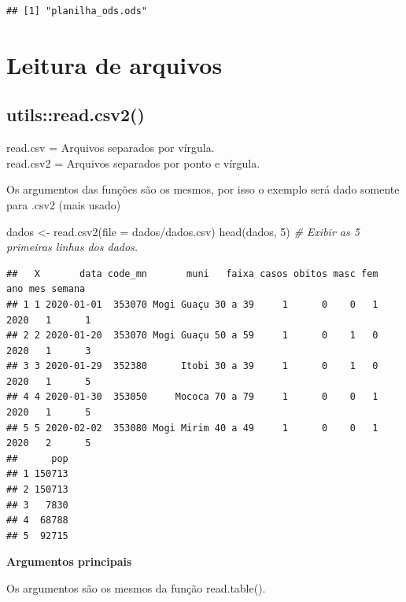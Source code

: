 \documentclass[
]{book}
\newenvironment{Shaded}{\begin{snugshade}}{\end{snugshade}}
\newcommand{\AttributeTok}[1]{\textcolor[rgb]{0.77,0.63,0.00}{#1}}
\newcommand{\CommentTok}[1]{\textcolor[rgb]{0.56,0.35,0.01}{\textit{#1}}}
\newcommand{\DecValTok}[1]{\textcolor[rgb]{0.00,0.00,0.81}{#1}}
\newcommand{\FunctionTok}[1]{\textcolor[rgb]{0.00,0.00,0.00}{#1}}
\newcommand{\NormalTok}[1]{#1}
\newcommand{\OtherTok}[1]{\textcolor[rgb]{0.56,0.35,0.01}{#1}}
\newcommand{\StringTok}[1]{\textcolor[rgb]{0.31,0.60,0.02}{#1}}
\theoremstyle{definition}
\theoremstyle{definition}
\theoremstyle{definition}
\theoremstyle{definition}
\theoremstyle{remark}
\begin{document}
\begin{verbatim}
## [1] "planilha_ods.ods"
\end{verbatim}

\hypertarget{leitura-de-arquivos}{%
\section{Leitura de arquivos}\label{leitura-de-arquivos}}

\hypertarget{utilsread.csv2}{%
\subsection{utils::read.csv2()}\label{utilsread.csv2}}

read.csv = Arquivos separados por vírgula.\\
read.csv2 = Arquivos separados por ponto e vírgula.

Os argumentos das funções são os mesmos, por isso o exemplo será dado somente para .csv2 (mais usado)

\begin{Shaded}
\begin{Highlighting}[]
\NormalTok{dados }\OtherTok{\textless{}{-}} \FunctionTok{read.csv2}\NormalTok{(}\AttributeTok{file =} \StringTok{\textquotesingle{}dados/dados.csv\textquotesingle{}}\NormalTok{)}
\FunctionTok{head}\NormalTok{(dados, }\DecValTok{5}\NormalTok{)          }\CommentTok{\# Exibir as 5 primeiras linhas dos dados.}
\end{Highlighting}
\end{Shaded}

\begin{verbatim}
##   X       data code_mn       muni   faixa casos obitos masc fem  ano mes semana
## 1 1 2020-01-01  353070 Mogi Guaçu 30 a 39     1      0    0   1 2020   1      1
## 2 2 2020-01-20  353070 Mogi Guaçu 50 a 59     1      0    1   0 2020   1      3
## 3 3 2020-01-29  352380      Itobi 30 a 39     1      0    1   0 2020   1      5
## 4 4 2020-01-30  353050     Mococa 70 a 79     1      0    0   1 2020   1      5
## 5 5 2020-02-02  353080 Mogi Mirim 40 a 49     1      0    0   1 2020   2      5
##      pop
## 1 150713
## 2 150713
## 3   7830
## 4  68788
## 5  92715
\end{verbatim}

\textbf{Argumentos principais}

Os argumentos são os mesmos da função read.table().
\end{document}
